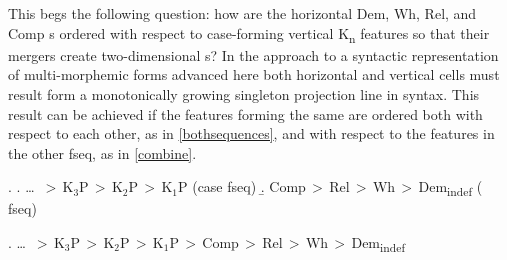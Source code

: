 \noindent
This begs the following question: how are the horizontal Dem, Wh, Rel, and Comp s ordered with respect to case-forming vertical K\textsubscript{n}  features so that their mergers create two-dimensional s? In the approach to a syntactic representation of multi-morphemic forms advanced here both horizontal and vertical cells must result form a monotonically growing singleton projection line in syntax. This result can be achieved if the features forming the same  are ordered both with respect to each other, as in \ref{bothsequences}, and with respect to the features in the other fseq, as in \ref{combine}.

\ex.\label{bothsequences} 
\a.\label{ver} \ldots \ $>$\,K$_{3}$P\,$>$\,K$_{2}$P\,$>$\,K$_{1}$P \hfill (case fseq) 
\b.\label{hor} Comp\,$>$\,Rel\,$>$\,Wh\,$>$\,Dem\textsubscript{indef}  \hfill ( fseq)

\ex.\label{combine} \ldots \ $>$\,K$_{3}$P\,$>$\,K$_{2}$P\,$>$\,K$_{1}$P\,$>$\,Comp\,$>$\,Rel\,$>$\,Wh\,$>$\,Dem\textsubscript{indef}

